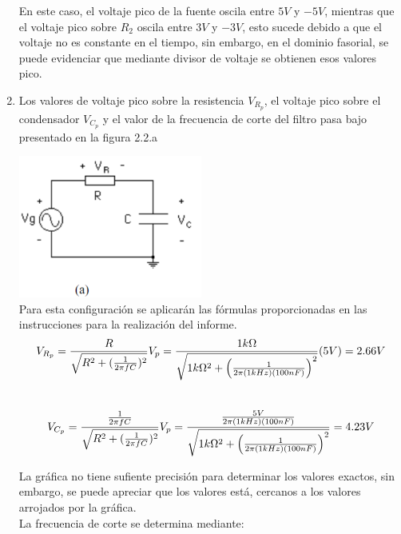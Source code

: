 \documentclass[12pt]{article}
\begin{document}
\begin{enumerate}
		\noindent En este caso, el voltaje pico de la fuente oscila entre $5V$ y $-5V$, mientras que el voltaje pico sobre $R_2$ oscila entre $3V$ y $-3V$, esto sucede debido a que el voltaje no es constante en el tiempo, sin embargo, en el dominio fasorial, se puede evidenciar que mediante divisor de voltaje se obtienen esos valores pico.
		
		\item Los valores de voltaje pico sobre la resistencia $V_{R_p}$, el
		voltaje pico sobre el condensador $V_{C_p}$ y el valor de la
		frecuencia de corte del filtro pasa bajo presentado en la figura 2.2.a
		
		\includegraphics{Img/2_2_a}\\
		
		\noindent Para esta configuración se aplicarán las fórmulas proporcionadas en las instrucciones para la realización del informe.\\
		
		\begin{equation}
			\notag V_{R_p} = \frac{R}{\sqrt{R^2 + (\frac{1}{2\pi f C})^2}}V_p = \frac{1k\Omega}{\sqrt{1k\Omega ^2 + \Big (\frac{1}{2\pi (1kHz) (100nF)}\Big)^2}}(5V) = 2.66V
		\end{equation}
		\\
		
		\begin{equation}
			\notag V_{C_p} = \frac{\frac{1}{2 \pi f C}}{\sqrt{R^2 + (\frac{1}{2\pi f C})^2}}V_p = \frac{\frac{5V}{2\pi (1kHz) (100nF)}}{\sqrt{1k\Omega ^2 + \Big (\frac{1}{2\pi (1kHz) (100nF)}\Big)^2}} = 4.23V
		\end{equation}
		
		\noindent La gráfica no tiene sufiente precisión para determinar los valores exactos, sin embargo, se puede apreciar que los valores está, cercanos a los valores arrojados por la gráfica.\\
		
		\noindent La frecuencia de corte se determina mediante:\\
		

\end{enumerate}
\end{document}
